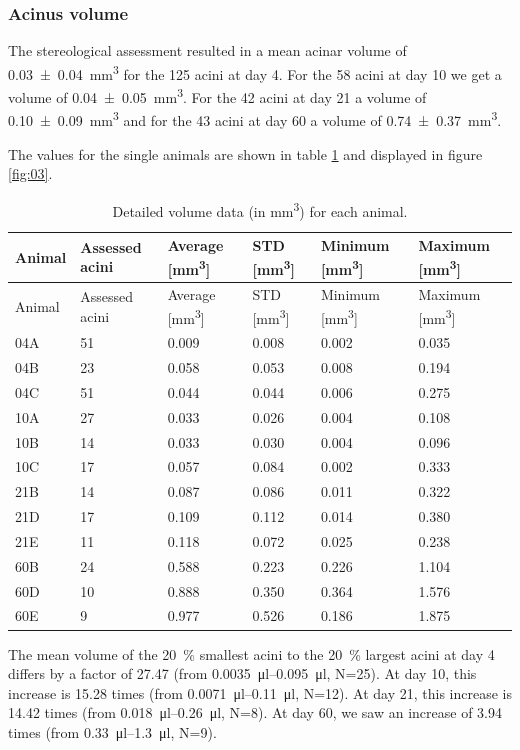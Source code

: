\documentclass[
  american,
]{article}
\begin{document}
\hypertarget{acinus-volume}{%
\subsubsection{Acinus volume}\label{acinus-volume}}

The stereological assessment resulted in a mean acinar volume of 0.03~±~0.04~mm\textsuperscript{3} for the 125 acini at day 4.
For the 58 acini at day 10 we get a volume of 0.04~±~0.05~mm\textsuperscript{3}.
For the 42 acini at day 21 a volume of 0.10~±~0.09~mm\textsuperscript{3} and for the 43 acini at day 60 a volume of 0.74~±~0.37~mm\textsuperscript{3}.

The values for the single animals are shown in table \ref{tbl:volumes} and displayed in figure \ref{fig:03}.

\begin{longtable}[]{@{}llllll@{}}
\caption{Detailed volume data (in mm\textsuperscript{3}) for each animal. \label{tbl:volumes}}\tabularnewline
\toprule
Animal & Assessed acini & Average {[}mm\textsuperscript{3}{]} & STD {[}mm\textsuperscript{3}{]} & Minimum {[}mm\textsuperscript{3}{]} & Maximum {[}mm\textsuperscript{3}{]}\tabularnewline
\midrule
\endfirsthead
\toprule
Animal & Assessed acini & Average {[}mm\textsuperscript{3}{]} & STD {[}mm\textsuperscript{3}{]} & Minimum {[}mm\textsuperscript{3}{]} & Maximum {[}mm\textsuperscript{3}{]}\tabularnewline
\midrule
\endhead
04A & 51 & 0.009 & 0.008 & 0.002 & 0.035\tabularnewline
04B & 23 & 0.058 & 0.053 & 0.008 & 0.194\tabularnewline
04C & 51 & 0.044 & 0.044 & 0.006 & 0.275\tabularnewline
10A & 27 & 0.033 & 0.026 & 0.004 & 0.108\tabularnewline
10B & 14 & 0.033 & 0.030 & 0.004 & 0.096\tabularnewline
10C & 17 & 0.057 & 0.084 & 0.002 & 0.333\tabularnewline
21B & 14 & 0.087 & 0.086 & 0.011 & 0.322\tabularnewline
21D & 17 & 0.109 & 0.112 & 0.014 & 0.380\tabularnewline
21E & 11 & 0.118 & 0.072 & 0.025 & 0.238\tabularnewline
60B & 24 & 0.588 & 0.223 & 0.226 & 1.104\tabularnewline
60D & 10 & 0.888 & 0.350 & 0.364 & 1.576\tabularnewline
60E & 9 & 0.977 & 0.526 & 0.186 & 1.875\tabularnewline
\bottomrule
\end{longtable}

The mean volume of the 20~\% smallest acini to the 20~\% largest acini at day 4 differs by a factor of 27.47 (from 0.0035~μl--0.095~μl, N=25).
At day 10, this increase is 15.28 times (from 0.0071~μl--0.11~μl, N=12).
At day 21, this increase is 14.42 times (from 0.018~μl--0.26~μl, N=8).
At day 60, we saw an increase of 3.94 times (from 0.33~μl--1.3~μl, N=9).
\end{document}
